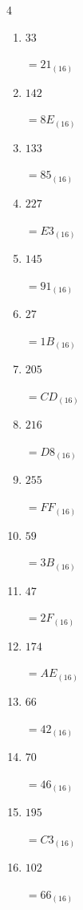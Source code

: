 \begin{multicols}{4}
\begin{enumerate}
        $=4A_{(16)}$

  \item $33$

        $=21_{(16)}$

  \item $142$

        $=8E_{(16)}$

  \item $133$

        $=85_{(16)}$

  \item $227$

        $=E3_{(16)}$

  \item $145$

        $=91_{(16)}$

  \item $27$

        $=1B_{(16)}$

  \item $205$

        $=CD_{(16)}$

  \item $216$

        $=D8_{(16)}$

\columnbreak %

  \item $255$

        $=FF_{(16)}$

  \item $59$

        $=3B_{(16)}$

  \item $47$

        $=2F_{(16)}$

  \item $174$

        $=AE_{(16)}$

  \item $66$

        $=42_{(16)}$

  \item $70$

        $=46_{(16)}$

  \item $195$

        $=C3_{(16)}$

  \item $102$

        $=66_{(16)}$


\end{enumerate}
\end{multicols}
